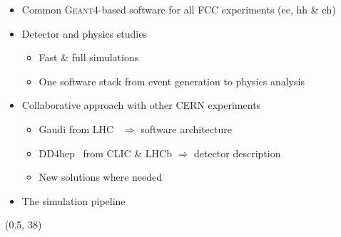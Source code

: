\documentclass[final,xcolor={dvipsnames,svgnames,x11names,table}]{beamer}
\begin{document}
\begin{frame}
\begin{textblock}{38}
\begin{tcolorbox}[title=FCCSW: simulation software for FCC]
  \vspace{0.5cm}
  \begin{itemize}
    \item Common \textsc{Geant4}-based software for all FCC experiments (ee, hh \& eh)~\cite{FCCSW} \vspace{0.5cm}
    \item Detector and physics studies \vspace{0.5cm}
      \begin{itemize}
        \item Fast \& full simulations
        \item One software stack from event generation to physics analysis \vspace{0.5cm}
      \end{itemize}
    \item Collaborative approach with other CERN experiments \vspace{0.5cm}
      \begin{itemize}
        \item Gaudi from LHC~\cite{Gaudi} $\Rightarrow$ software architecture
        \item DD4hep~\cite{DD4hep} from CLIC \& LHCb $\Rightarrow$ detector description
        \item New solutions where needed
      \end{itemize}
    \item The simulation pipeline
  \end{itemize}

  \vspace{0.5cm}

  \centering
     \vspace{0.5cm}
  \end{tcolorbox}
\end{textblock}

\begin{textblock}{83}(0.5, 38)
  \begin{tcolorbox}[title=The IDEA detector concept for FCC-ee]


\end{tcolorbox}
\end{textblock}
\end{frame}
\end{document}
